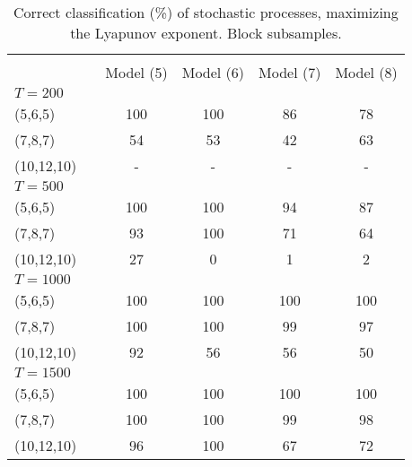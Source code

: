 \documentclass[12pt]{article}
\begin{document}
\begin{table} [H]\scriptsize
    \caption{ Correct classification (\%) of stochastic processes, maximizing the Lyapunov exponent. Block subsamples.}
    \begin{tabular*}{\textwidth}{@{\extracolsep{\fill}}lccccc}
        \hline &  &  &  & &   \\ 
          &  &  Model (5) & Model (6)  & Model (7) & Model (8)  \\ 
        $T=200$  &  &  &  & &   \\
        (5,6,5)                           &    & 100 &  100 & 86 & 78 \\ 
        (7,8,7)                           &    &  54 &   53   & 42 & 63  \\ 
        (10,12,10)                        &    &  -  & -    & -  & -\\ 
        \hline 
                
         $T=500$  &  &   & & &   \\ 

        (5,6,5)                           &   & 100 &  100 & 94  & 87 \\ 
        (7,8,7)                           &   & 93 &   100 & 71  & 64 \\ 
        (10,12,10)                        &   & 27   &  0  & 1   &  2 \\ 
\hline 
         $T=1000$  &  &   &   &  &  \\ 

        (5,6,5)                           &  &  100   & 100 & 100 & 100   \\ 
        (7,8,7)                           &  &  100   & 100 & 99  & 97 \\ 
        (10,12,10)                        &  &   92   & 56  & 56  & 50  \\ 
\hline      
         $T=1500$  &  &   &   &  &  \\ 

        (5,6,5)                           &  &  100  & 100 & 100 & 100 \\ 
        (7,8,7)                           &  &  100  & 100 & 99  & 98  \\ 
        (10,12,10)                        &  &  96   & 100 & 67  & 72 \\ 
\hline      
    \end{tabular*}
\end{table}
\end{document}
